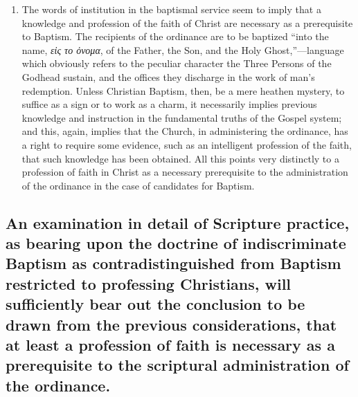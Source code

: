 \documentclass[english,]{book}
\begin{document}
\begin{enumerate}
\item
  The words of institution in the baptismal service seem to imply that a knowledge and profession of the faith of Christ are necessary as a prerequisite to Baptism. The recipients of the ordinance are to be baptized ``into the name, \emph{εἰς το ὀνομα}, of the Father, the Son, and the Holy Ghost,''---language which obviously refers to the peculiar character the Three Persons of the Godhead sustain, and the offices they discharge in the work of man's redemption. Unless Christian Baptism, then, be a mere heathen mystery, to suffice as a sign or to work as a charm, it necessarily implies previous knowledge and instruction in the fundamental truths of the Gospel system; and this, again, implies that the Church, in administering the ordinance, has a right to require some evidence, such as an intelligent profession of the faith, that such knowledge has been obtained. All this points very distinctly to a profession of faith in Christ as a necessary prerequisite to the administration of the ordinance in the case of candidates for Baptism.
\end{enumerate}

\hypertarget{an-examination-in-detail-of-scripture-practice-as-bearing-upon-the-doctrine-of-indiscriminate-baptism-as-contradistinguished-from-baptism-restricted-to-professing-christians-will-sufficiently-bear-out-the-conclusion-to-be-drawn-from-the-previous-considerations-that-at-least-a-profession-of-faith-is-necessary-as-a-prerequisite-to-the-scriptural-administration-of-the-ordinance.}{%
\subsection{An examination in detail of Scripture practice, as bearing upon the doctrine of indiscriminate Baptism as contradistinguished from Baptism restricted to professing Christians, will sufficiently bear out the conclusion to be drawn from the previous considerations, that at least a profession of faith is necessary as a prerequisite to the scriptural administration of the ordinance.}\label{an-examination-in-detail-of-scripture-practice-as-bearing-upon-the-doctrine-of-indiscriminate-baptism-as-contradistinguished-from-baptism-restricted-to-professing-christians-will-sufficiently-bear-out-the-conclusion-to-be-drawn-from-the-previous-considerations-that-at-least-a-profession-of-faith-is-necessary-as-a-prerequisite-to-the-scriptural-administration-of-the-ordinance.}}
\end{document}
